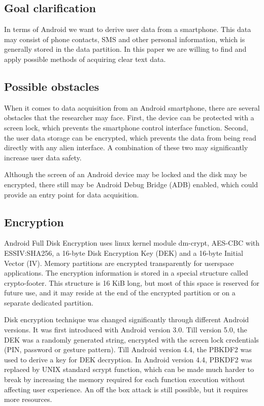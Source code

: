 \subsection{Goal clarification}

In terms of Android we want to derive user data from a smartphone. This data may consist of phone contacts, SMS and other personal information, which is generally stored in the data partition. In this paper we are willing to find and apply possible methods of acquiring clear text data.

\subsection{Possible obstacles}

When it comes to data acquisition from an Android smartphone, there are several obstacles that the researcher may face. First, the device can be protected with a screen lock, which prevents the smartphone control interface function. Second, the user data storage can be encrypted, which prevents the data from being read directly with any alien interface. A combination of these two may significantly increase user data safety. 

Although the screen of an Android device may be locked and the disk may be encrypted, there still may be Android Debug Bridge (ADB) enabled, which could provide an entry point for data acquisition.

\subsection{Encryption}
\label{section:encryption}

Android Full Disk Encryption uses linux kernel module dm-crypt, AES-CBC with ESSIV:SHA256, a 16-byte Disk Encryption Key (DEK) and a 16-byte Initial Vector (IV). Memory partitions are encrypted transparently for userspace applications. The encryption information is stored in a special structure called crypto-footer. This structure is 16 KiB long, but most of this space is reserved for future use, and it may reside at the end of the encrypted partition or on a separate dedicated partition. 

Disk encryption technique was changed significantly through different Android versions. It was first introduced with Android version 3.0. Till version 5.0, the DEK was a randomly generated string, encrypted with the screen lock credentials (PIN, password or gesture pattern). Till Android version 4.4, the PBKDF2 was used to derive a key for DEK decryption. In Android version 4.4, PBKDF2 was replaced by UNIX standard scrypt function, which can be made much harder to break by increasing the memory required for each function execution without affecting user experience. An off the box attack is still possible, but it requires more resources. 

